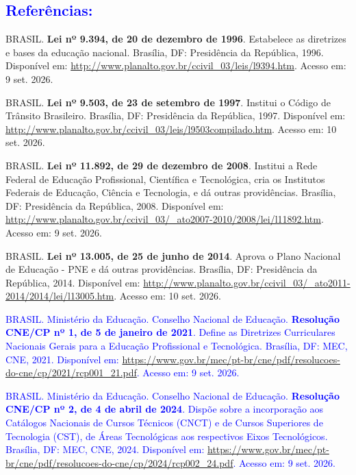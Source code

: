 \documentclass{../../modelos/latex-shared/ifsc-ppc}
\newcommand{\revisao}[1]{\textcolor{blue}{#1}}
\newcommand{\revisao}[1]{#1}
\begin{document}
\subsection{\revisao{Referências:}}

{\raggedright
\linespread{1.0}\selectfont
\setlength{\parindent}{0pt}
\setlength{\parskip}{\baselineskip}

BRASIL. \textbf{Lei nº 9.394, de 20 de dezembro de 1996}. Estabelece as diretrizes e bases da educação nacional. Brasília, DF: Presidência da República, 1996. Disponível em: \url{http://www.planalto.gov.br/ccivil_03/leis/l9394.htm}. Acesso em: 9 set. 2026.

BRASIL. \textbf{Lei nº 9.503, de 23 de setembro de 1997}. Institui o Código de Trânsito Brasileiro. Brasília, DF: Presidência da República, 1997. Disponível em: \url{http://www.planalto.gov.br/ccivil_03/leis/l9503compilado.htm}. Acesso em: 10 set. 2026.

BRASIL. \textbf{Lei nº 11.892, de 29 de dezembro de 2008}. Institui a Rede Federal de Educação Profissional, Científica e Tecnológica, cria os Institutos Federais de Educação, Ciência e Tecnologia, e dá outras providências. Brasília, DF: Presidência da República, 2008. Disponível em: \url{http://www.planalto.gov.br/ccivil_03/_ato2007-2010/2008/lei/l11892.htm}. Acesso em: 9 set. 2026.

BRASIL. \textbf{Lei nº 13.005, de 25 de junho de 2014}. Aprova o Plano Nacional de Educação - PNE e dá outras providências. Brasília, DF: Presidência da República, 2014. Disponível em: \url{http://www.planalto.gov.br/ccivil_03/_ato2011-2014/2014/lei/l13005.htm}. Acesso em: 10 set. 2026.

\revisao{BRASIL. Ministério da Educação. Conselho Nacional de Educação. \textbf{Resolução CNE/CP nº 1, de 5 de janeiro de 2021}. Define as Diretrizes Curriculares Nacionais Gerais para a Educação Profissional e Tecnológica. Brasília, DF: MEC, CNE, 2021. Disponível em: \url{https://www.gov.br/mec/pt-br/cne/pdf/resolucoes-do-cne/cp/2021/rcp001_21.pdf}. Acesso em: 9 set. 2026.}

\revisao{BRASIL. Ministério da Educação. Conselho Nacional de Educação. \textbf{Resolução CNE/CP nº 2, de 4 de abril de 2024}. Dispõe sobre a incorporação aos Catálogos Nacionais de Cursos Técnicos (CNCT) e de Cursos Superiores de Tecnologia (CST), de Áreas Tecnológicas aos respectivos Eixos Tecnológicos. Brasília, DF: MEC, CNE, 2024. Disponível em: \url{https://www.gov.br/mec/pt-br/cne/pdf/resolucoes-do-cne/cp/2024/rcp002_24.pdf}. Acesso em: 9 set. 2026.}

}
\end{document}
